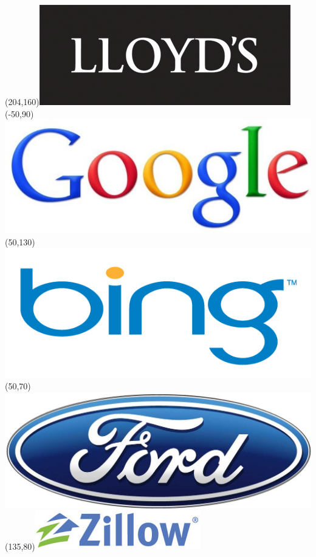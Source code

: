 \begin{frame}
\Put(204,160){\includegraphics[scale=.16]{../common/pics/R_using_logos/lloyds}}
\Put(-50,90){\includegraphics[scale=.12]{../common/pics/R_using_logos/google}}
\Put(50,130){\includegraphics[scale=.12]{../common/pics/R_using_logos/bing}}
\Put(50,70){\includegraphics[scale=.29]{../common/pics/R_using_logos/ford}}
\Put(135,80){\includegraphics[scale=.25]{../common/pics/R_using_logos/zillow}}

\end{frame}
